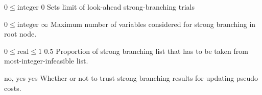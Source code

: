 %
{$0\leq\textrm{integer}$}%
{$0$}%
{Sets limit of look-ahead strong-branching trials}%
{}

%
{$0\leq\textrm{integer}$}%
{$\infty$}%
{Maximum number of variables considered for strong branching in root node.}%
{}

%
{$0\leq\textrm{real}\leq1$}%
{$0.5$}%
{Proportion of strong branching list that has to be taken from most-integer-infeasible list.}%
{}

%
{\ttfamily no, yes}%
{yes}%
{Whether or not to trust strong branching results for updating pseudo costs.}%
{}

